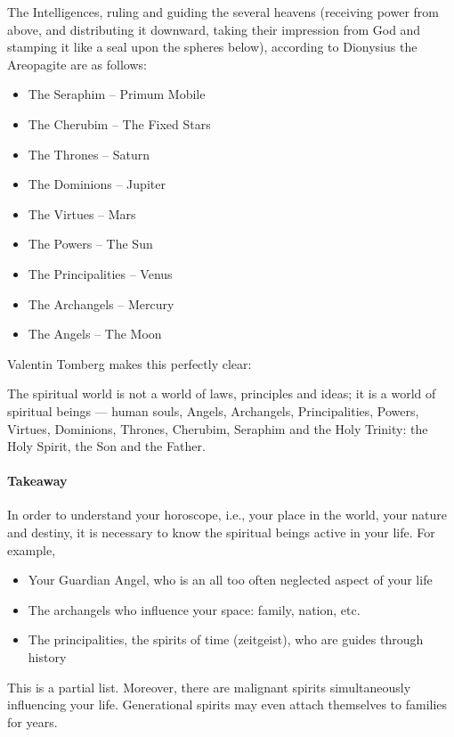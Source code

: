 \begin{quotationx}
The Intelligences, ruling and guiding the several heavens (receiving power from above, and distributing it downward,
taking their impression from God and stamping it like a seal upon the spheres below), according to Dionysius the
Areopagite are as follows:

\begin{itemize}[nosep]
\item
The Seraphim – Primum Mobile 

\item
The Cherubim – The Fixed Stars 

\item
The Thrones – Saturn 

\item
The Dominions – Jupiter 

\item
The Virtues – Mars 

\item
The Powers – The Sun 

\item
The Principalities – Venus 

\item
The Archangels – Mercury 

\item
The Angels – The Moon 
\end{itemize}
\end{quotationx}

Valentin Tomberg makes this perfectly clear:

\begin{quotex}
The spiritual world is not a world of laws, principles and ideas; it is a world of spiritual beings — human
souls, Angels, Archangels, Principalities, Powers, Virtues, Dominions, Thrones, Cherubim, Seraphim and the Holy
Trinity: the Holy Spirit, the Son and the Father. 

\end{quotex}

\paragraph{Takeaway}
In order to understand your horoscope, i.e., your place in the world, your nature and destiny, it is necessary to know
the spiritual beings active in your life. For example,

\begin{itemize}
\item Your Guardian Angel, who is an all too often neglected aspect of your life 
\item The archangels who influence your space: family, nation, etc. 
\item The principalities, the spirits of time (zeitgeist), who are guides through history 
\end{itemize}
This is a partial list. Moreover, there are malignant spirits simultaneously influencing your life. Generational spirits
may even attach themselves to families for years.

